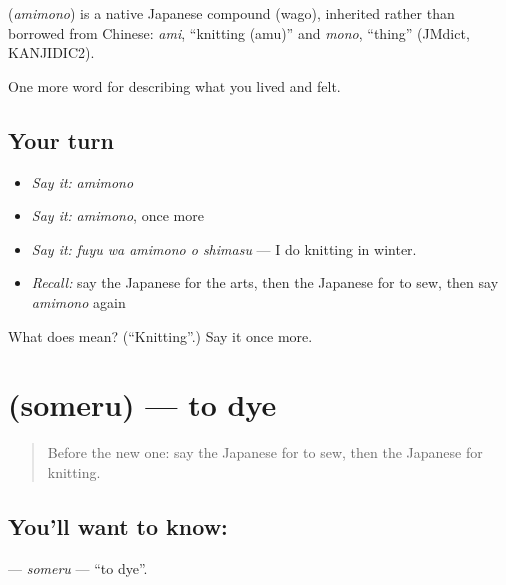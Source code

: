 \begin{cousinweb}
\textbf{} (\emph{amimono}) is a native Japanese compound (wago), inherited rather than borrowed from Chinese: \emph{ami}, \textquotedblleft{}knitting (amu)\textquotedblright{} and \emph{mono}, \textquotedblleft{}thing\textquotedblright{} (JMdict, KANJIDIC2).
\end{cousinweb}

\begin{grammarlens}[title={What you've built}]
One more word for describing what you lived and felt.
\end{grammarlens}

\subsection*{Your turn}
\begin{itemize}
\raggedright
  \item \emph{Say it:} \emph{amimono}
  \item \emph{Say it:} \emph{amimono}, once more
  \item \emph{Say it:} \emph{fuyu wa amimono o shimasu} — I do knitting in winter.
  \item \emph{Recall:} say the Japanese for the arts, then the Japanese for to sew, then say \emph{amimono} again
\end{itemize}

\begin{tcolorbox}[breakable,colback=teal!4,colframe=teal!35!black,title={Before you move on}]
What does  mean? (\textquotedblleft{}Knitting\textquotedblright{}.) Say it once more.
\end{tcolorbox}
\section[\texorpdfstring{\ja{そめる} (someru)}{そめる (someru)}]{ (someru) — to dye}

\label{lesson:JA-C467-someru}



\begin{quote}
Before the new one: say the Japanese for to sew, then the Japanese for knitting.
\end{quote}

\subsection*{You'll want to know: }
\textbf{} — \emph{someru} — \textquotedblleft{}to dye\textquotedblright{}.

